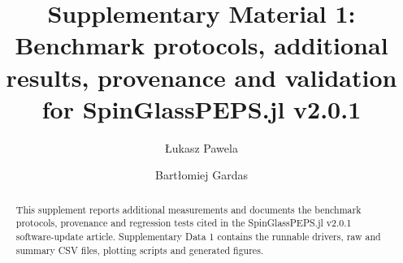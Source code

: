\documentclass[preprint,12pt,a4paper]{elsarticle}
\begin{document}
\begin{frontmatter}

\title{Supplementary Material 1: Benchmark protocols, additional results,
provenance and validation for SpinGlassPEPS.jl v2.0.1}

\author[iitis]{\L{}ukasz Pawela}
\author[iitis]{Bart\l{}omiej Gardas}

\address[iitis]{Institute of Theoretical and Applied Informatics, Polish Academy
of Sciences, Ba\l{}tycka 5, 44-100 Gliwice, Poland}

\begin{abstract}
This supplement reports additional measurements and documents the benchmark
protocols, provenance and regression tests cited in the SpinGlassPEPS.jl v2.0.1
software-update article. Supplementary Data 1 contains the runnable drivers, raw
and summary CSV files, plotting scripts and generated figures.
\end{abstract}

\end{frontmatter}

\setcounter{section}{0}
\setcounter{table}{0}
\setcounter{equation}{0}
\renewcommand{\thesection}{S\arabic{section}}
\renewcommand{\thesubsection}{\thesection.\arabic{subsection}}
\renewcommand{\thetable}{S\arabic{table}}
\renewcommand{\theequation}{S\arabic{equation}}
\newcommand{\suppdatadir}{\path{benchmarks/}}
\newcommand{\suppfile}[1]{\path{benchmarks/#1}}


\FloatBarrier
\end{document}
